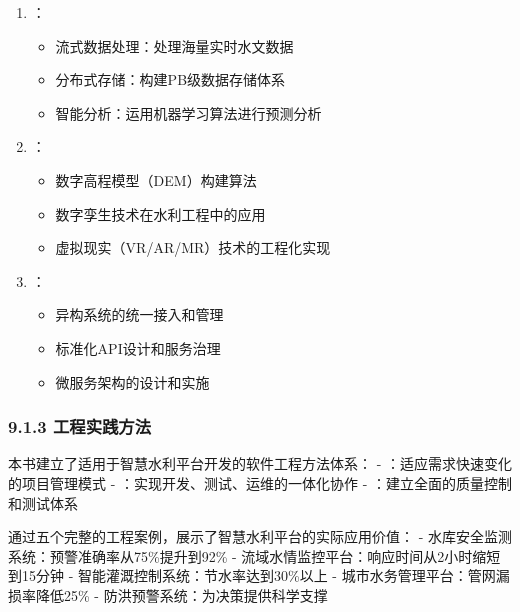 \begin{enumerate}
\def\labelenumi{\arabic{enumi}.}
\tightlist
\item
  ：

  \begin{itemize}
  \tightlist
  \item
    流式数据处理：处理海量实时水文数据
  \item
    分布式存储：构建PB级数据存储体系
  \item
    智能分析：运用机器学习算法进行预测分析
  \end{itemize}
\item
  ：

  \begin{itemize}
  \tightlist
  \item
    数字高程模型（DEM）构建算法
  \item
    数字孪生技术在水利工程中的应用
  \item
    虚拟现实（VR/AR/MR）技术的工程化实现
  \end{itemize}
\item
  ：

  \begin{itemize}
  \tightlist
  \item
    异构系统的统一接入和管理
  \item
    标准化API设计和服务治理
  \item
    微服务架构的设计和实施
  \end{itemize}
\end{enumerate}

\hypertarget{ux5de5ux7a0bux5b9eux8df5ux65b9ux6cd5}{%
\subsubsection{9.1.3 工程实践方法}\label{ux5de5ux7a0bux5b9eux8df5ux65b9ux6cd5}}


本书建立了适用于智慧水利平台开发的软件工程方法体系： - ：适应需求快速变化的项目管理模式 - ：实现开发、测试、运维的一体化协作 - ：建立全面的质量控制和测试体系


通过五个完整的工程案例，展示了智慧水利平台的实际应用价值： - 水库安全监测系统：预警准确率从75\%提升到92\% - 流域水情监控平台：响应时间从2小时缩短到15分钟 - 智能灌溉控制系统：节水率达到30\%以上 - 城市水务管理平台：管网漏损率降低25\% - 防洪预警系统：为决策提供科学支撑

